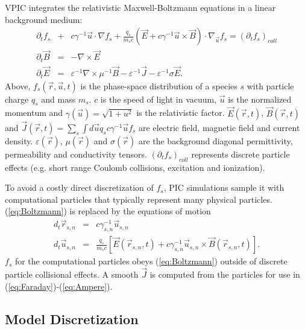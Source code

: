 \documentclass[letter,10pt]{article}
\newcommand{\eps}{\varepsilon}
\newcommand{\vecr}{\vec{r}}
\newcommand{\vecu}{\vec{u}}
\newcommand{\vecJ}{\vec{J}}
\newcommand{\vecE}{\vec{E}}
\newcommand{\vecB}{\vec{B}}
\newcommand{\Deriv}[2]{d_{#2}#1}
\newcommand{\PDeriv}[2]{\partial_{#2}#1}
\newcommand{\DotP}[2]{#1 \cdot #2}
\newcommand{\CrossP}[2]{#1 \times #2}
\newcommand{\Grad}[1]{\nabla #1}
\newcommand{\Curl}[1]{\nabla \times #1}
\newcommand{\Gradu}[1]{\nabla_{\vecu} #1}
\newcommand{\eq}[1]{(\ref{eq:#1})}
\begin{document}
VPIC integrates the relativistic Maxwell-Boltzmann equations in a
linear background medium:
\begin{eqnarray}
\PDeriv{f_s}{t} &+& 
\DotP{c\gamma^{-1}\vecu}{\Grad{f_s}} +
\DotP{\frac{q_s}{m_s c}\left(\vecE+\CrossP{c\gamma^{-1}\vecu}{\vecB}\right)}
{\Gradu{f_s}} = \left(\PDeriv{f_s}{t}\right)_{coll} \label{eq:Boltzmann}\\
\PDeriv{\vecB}{t} &=& -\Curl{\vecE} \label{eq:Faraday}\\
\PDeriv{\vecE}{t} &=&
\eps^{-1}\Curl{\mu^{-1}\vecB} - \eps^{-1}\vecJ - \eps^{-1}\sigma\vecE
\label{eq:Ampere}
.
\end{eqnarray}
Above, $f_s\left(\vecr,\vecu,t\right)$ is the phase-space distribution
of a species $s$ with particle charge $q_s$ and mass $m_s$.  $c$ is
the speed of light in vacuum, $\vecu$ is the normalized momentum and
$\gamma\left(\vecu\right) = \sqrt{1 + u^2}$ is the relativistic
factor.  $\vecE\left(\vecr,t\right)$, $\vecB\left(\vecr,t\right)$ and
$\vecJ\left(\vecr,t\right) = \sum_s \int d\vecu q_s c\gamma^{-1}\vecu
f_s$ are electric field, magnetic field and current density.
$\eps\left(\vecr\right)$, $\mu\left(\vecr\right)$ and
$\sigma\left(\vecr\right)$ are the background diagonal permittivity,
permeability and conductivity tensors.
$\left(\PDeriv{f_s}{t}\right)_{coll}$ represents discrete particle
effects (e.g. short range Coulomb collisions, excitation and
ionization).

To avoid a costly direct discretization of $f_s$, PIC simulations
sample it with computational particles that typically represent many
physical particles.  \eq{Boltzmann} is replaced by the equations of
motion
\begin{eqnarray}
\Deriv{\vecr_{s,n}}{t} &=& c \gamma_{s,n}^{-1} \vecu_{s,n} \label{eq:Position}\\
\Deriv{\vecu_{s,n}}{t} &=& \frac{q_s}{m_s c} \left[
\vecE\left(\vecr_{s,n},t\right) +
\CrossP{c\gamma_{s,n}^{-1}\vecu_{s,n}}{\vecB\left(\vecr_{s,n},t\right)}
\right] \label{eq:Momentum}
.
\end{eqnarray}
$f_s$ for the computational particles obeys \eq{Boltzmann} outside of
discrete particle collisional effects.  A smooth $\vecJ$ is computed
from the particles for use in \eq{Faraday}-\eq{Ampere}.

\subsection{Model Discretization}
\end{document}
